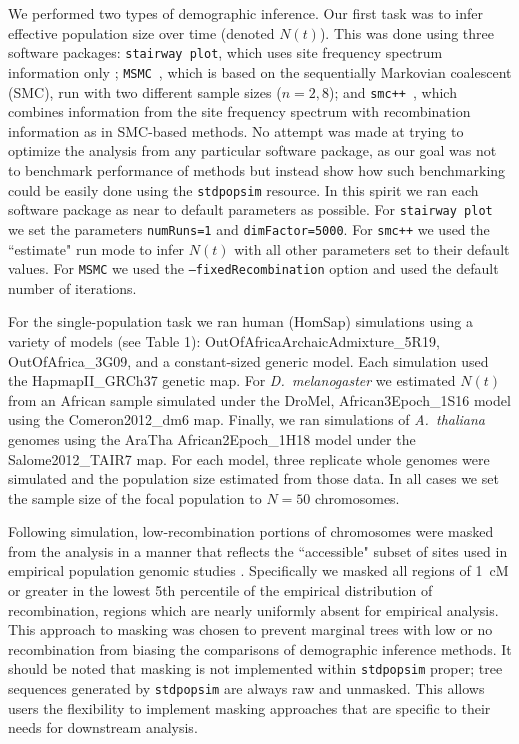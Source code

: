 \documentclass[12pt,halfline,a4paper]{ouparticle}
\newcommand{\stdpopsim}{\texttt{stdpopsim}\xspace}
\newcommand{\MSMC}{\texttt{MSMC}\xspace}
\newcommand{\smcpp}{\texttt{smc++}\xspace}
\newcommand{\stairwayplot}{\texttt{stairway plot}\xspace}
\begin{document}
We performed two types of demographic inference.
Our first task was to infer effective population size over time (denoted $N(t)$).
This was done using three software packages: \stairwayplot,
which uses site frequency spectrum information only \citep{liu2015exploring};
\MSMC~\citep{schiffels2014inferring},
which is based on the sequentially Markovian coalescent (SMC),
run with two different sample sizes ($n = 2 , 8$);
and \smcpp~\citep{terhorst2017robust},
which combines information from the site frequency spectrum with
recombination information as in SMC-based methods. No attempt
was made at trying to optimize the analysis from
any particular software package,
as our goal was not to benchmark performance of methods but
instead show how such benchmarking could be easily done using
the \stdpopsim resource. In this spirit we ran each software package as near
to default parameters as possible. For \stairwayplot we
set the parameters \texttt{numRuns=1} and \texttt{dimFactor=5000}.
For \smcpp we used the ``estimate" run mode to infer $N(t)$ with all other parameters set
to their default values. For \MSMC we used the \texttt{--fixedRecombination}
option and used the default number of iterations.

For the single-population task we ran human (HomSap) simulations
using a variety of models (see Table 1): OutOfAfricaArchaicAdmixture\_5R19, OutOfAfrica\_3G09,
and a constant-sized generic model.
Each simulation
used the HapmapII\_GRCh37 genetic map. For \textit{D.~melanogaster}
we estimated $N(t)$ from an African sample simulated under the DroMel,
African3Epoch\_1S16 model using the Comeron2012\_dm6 map.
Finally, we ran simulations of \textit{A.~thaliana} genomes using the
AraTha African2Epoch\_1H18 model under the Salome2012\_TAIR7 map.
For each model, three replicate whole genomes were
simulated and the population size estimated from those data. In all cases we
set the sample size of the focal population to $N=50$ chromosomes.

Following simulation, low-recombination portions of chromosomes were masked
from the analysis in a manner that reflects the ``accessible" subset of sites
used in empirical population genomic studies \citep[e.g.,][]{danecek20111000,langley2012genomic}.
Specifically we masked all regions of \SI{1}{cM} or greater in the lowest 5th percentile of the empirical
distribution of recombination, regions which are nearly uniformly absent for empirical analysis.
This approach to masking was chosen to prevent marginal trees with low or no recombination 
from biasing the comparisons of demographic inference methods. It should be noted that masking is not implemented 
within \texttt{stdpopsim} proper; tree sequences generated by \texttt{stdpopsim} are always raw and unmasked. 
This allows users the flexibility to implement masking approaches that are specific to their needs 
for downstream analysis.
\end{document}
